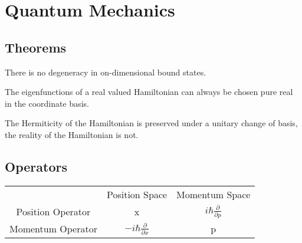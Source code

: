 \chapter{Quantum Mechanics}

\section{Theorems}
\begin{theorem}
	There is no degeneracy in on-dimensional bound states.
\end{theorem}

\begin{theorem}
	The eigenfunctions of a real valued Hamiltonian can always be chosen pure real in the coordinate basis.
\end{theorem}


\begin{theorem}
	The Hermiticity of the Hamiltonian is preserved under a unitary change of basis, the reality of the Hamiltonian is 
	not.
\end{theorem}

\section{Operators}

\begin{center}
\begin{tabular}{ |c|c|c|}
 \hline
   & Position Space & Momentum Space \\
  Position Operator & x & $i\hbar \frac{\partial}{\partial p}$ \\
  Momentum Operator & $-i\hbar \frac{\partial}{\partial x}$ & p \\
 \hline
\end{tabular}
\end{center}

